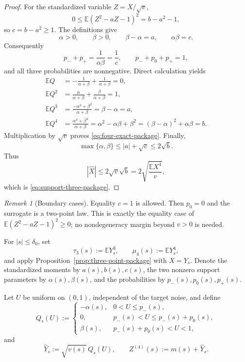 \documentclass[11pt]{article}
\theoremstyle{definition}
\theoremstyle{remark}
\newtheorem{remark}[theorem]{Remark}
\newcommand{\E}{\mathbb E}
\begin{document}
\begin{proof}
For the standardized variable \(Z=X/\sqrt v\),
\[
 0\le\E(Z^2-aZ-1)^2=b-a^2-1,
\]
so \(c=b-a^2\ge1\).  The definitions give
\begin{equation}\label{eq:alpha-identities-package}
 \alpha>0,
 \qquad
 \beta>0,
 \qquad
 \beta-\alpha=a,
 \qquad
 \alpha\beta=c.
\end{equation}
Consequently
\[
 p_-+p_+
 =\frac{1}{\alpha\beta}=\frac1c,
 \qquad
 p_-+p_0+p_+=1,
\]
and all three probabilities are nonnegative.  Direct calculation yields
\begin{align*}
 \E Q
 &=-\frac{1}{\alpha+\beta}
   +\frac{1}{\alpha+\beta}=0,\\
 \E Q^2
 &=\frac{\alpha}{\alpha+\beta}
   +\frac{\beta}{\alpha+\beta}=1,\\
 \E Q^3
 &=\frac{-\alpha^2+\beta^2}{\alpha+\beta}
   =\beta-\alpha=a,\\
 \E Q^4
 &=\frac{\alpha^3+\beta^3}{\alpha+\beta}
   =\alpha^2-\alpha\beta+\beta^2
   =(\beta-\alpha)^2+\alpha\beta=b.
\end{align*}
Multiplication by \(\sqrt v\) proves \eqref{eq:four-exact-package}.  Finally,
\[
 \max\{\alpha,\beta\}
 \le |a|+\sqrt c
 \le2\sqrt b.
\]
Thus
\[
 |\widehat X|
 \le2\sqrt v\sqrt b
 =2\sqrt{\frac{\E X^4}{v}},
\]
which is \eqref{eq:support-three-package}.
\end{proof}

\begin{remark}[Boundary cases]
Equality \(c=1\) is allowed.  Then \(p_0=0\) and the surrogate is a two-point
law.  This is exactly the equality case of
\(\E(Z^2-aZ-1)^2\ge0\); no nondegeneracy margin beyond \(v>0\) is needed.
\end{remark}

For \(|s|\le\delta_0\), set
\begin{equation}\label{eq:shifted-moments-package}
 \tau_3(s):=\E Y_s^3,
 \qquad
 \mu_4(s):=\E Y_s^4,
\end{equation}
and apply Proposition~\ref{prop:three-point-package} with \(X=Y_s\).  Denote
the standardized moments by \(a(s),b(s),c(s)\), the two nonzero support
parameters by \(\alpha(s),\beta(s)\), and the probabilities by
\(p_-(s),p_0(s),p_+(s)\).

Let \(U\) be uniform on \((0,1)\), independent of the target noise, and define
\begin{equation}\label{eq:Q-s-U-package}
 Q_s(U):=
 \begin{cases}
 -\alpha(s),&0<U\le p_-(s),\\
 0,&p_-(s)<U\le p_-(s)+p_0(s),\\
 \beta(s),&p_-(s)+p_0(s)<U<1,
 \end{cases}
\end{equation}
and
\begin{equation}\label{eq:Yhat-s-package}
 \widehat Y_s:=\sqrt{v(s)}\,Q_s(U),
 \qquad
 Z^{(4)}(s):=m(s)+\widehat Y_s.
\end{equation}
\end{document}
